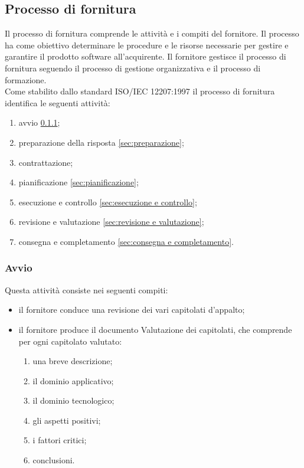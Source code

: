 \subsection{Processo di fornitura}\label{sec:organizationalP}
Il processo di fornitura comprende le attività e i compiti del fornitore. Il processo ha come obiettivo determinare le procedure e le risorse necessarie per gestire e garantire il prodotto software all'acquirente.
Il fornitore gestisce il processo di fornitura seguendo il processo di gestione organizzativa e il processo di formazione. \\
    Come stabilito dallo standard ISO/IEC 12207:1997 \cite{bib:ISO12207_1997} il processo di fornitura identifica le seguenti attività:
    \begin{enumerate}
        \item avvio \ref{sec:avvio};
        \item preparazione della risposta \ref{sec:preparazione};
        \item contrattazione;
        \item pianificazione \ref{sec:pianificazione};
        \item esecuzione e controllo \ref{sec:esecuzione e controllo};
        \item revisione e valutazione \ref{sec:revisione e valutazione};
        \item consegna e completamento \ref{sec:consegna e completamento}.
    \end{enumerate}

    \subsubsection{Avvio}\label{sec:avvio}
        Questa attività consiste nei seguenti compiti:
        \begin{itemize}
            \item il fornitore conduce una revisione dei vari capitolati d'appalto;
            \item il fornitore produce il documento Valutazione dei capitolati, che comprende per ogni capitolato valutato:
            \begin{enumerate}
                \item una breve descrizione;
                \item il dominio applicativo;
                \item il dominio tecnologico;
                \item gli aspetti positivi;
                \item i fattori critici;
                \item conclusioni.
            \end{enumerate}
        \end{itemize}

